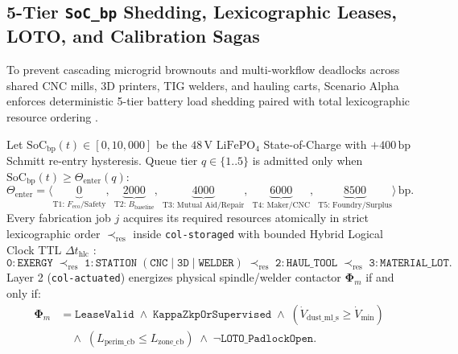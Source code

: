 \subsection{5-Tier \texttt{SoC\_bp} Shedding, Lexicographic Leases, LOTO, and Calibration Sagas}

To prevent cascading microgrid brownouts and multi-workflow deadlocks across shared CNC
mills, 3D printers, TIG welders, and hauling carts, Scenario Alpha enforces deterministic
5-tier battery load shedding paired with total lexicographic resource ordering \parencite{coffman1971deadlocks,liu1973scheduling}.

\begin{invariant}
\label{inv:alpha-fab}
Let $\mathrm{SoC}_{\mathrm{bp}}(t) \in [0, 10{,}000]$ be the $48\,\mathrm{V}$ $\mathrm{LiFePO_4}$
State-of-Charge with $+400\,\mathrm{bp}$ Schmitt re-entry hysteresis. Queue tier $q \in \{1..5\}$
is admitted only when $\mathrm{SoC}_{\mathrm{bp}}(t) \ge \Theta_{\mathrm{enter}}(q)$:
\begin{equation}
    \Theta_{\mathrm{enter}} = \big\langle \underbrace{0}_{\text{T1: } F_{\mathrm{eco}}/\text{Safety}},\;
    \underbrace{2000}_{\text{T2: } B_{\mathrm{baseline}}},\;
    \underbrace{4000}_{\text{T3: Mutual Aid/Repair}},\;
    \underbrace{6000}_{\text{T4: Maker/CNC}},\;
    \underbrace{8500}_{\text{T5: Foundry/Surplus}} \big\rangle\,\mathrm{bp}.
    \label{eq:alpha-soc-tiers}
\end{equation}
Every fabrication job $j$ acquires its required resources atomically in strict lexicographic
order $\prec_{\mathrm{res}}$ inside \texttt{col-storaged} with bounded Hybrid Logical Clock
TTL $\Delta t_{\mathrm{hlc}}$ \parencite{kulkarni2014logical}:
{\small
\begin{equation}
    \mathtt{0:EXERGY} \;\prec_{\mathrm{res}}\; \mathtt{1:STATION\;(CNC \mid 3D \mid WELDER)} \;\prec_{\mathrm{res}}\; \mathtt{2:HAUL\_TOOL} \;\prec_{\mathrm{res}}\; \mathtt{3:MATERIAL\_LOT}.
    \label{eq:alpha-lex}
\end{equation}
}
Layer 2 (\texttt{col-actuated}) energizes physical spindle/welder contactor $\mathbf{\Phi}_m$
if and only if:
{\small
\begin{equation}
\begin{aligned}
    \mathbf{\Phi}_m &= \mathtt{LeaseValid} \;\land\; \mathtt{KappaZkpOrSupervised} \;\land\; (\dot{V}_{\mathrm{dust\_ml\_s}} \ge \dot{V}_{\min}) \\
    &\quad \land\; (L_{\mathrm{perim\_cb}} \le L_{\mathrm{zone\_cb}}) \;\land\; \neg\mathtt{LOTO\_PadlockOpen}.
\end{aligned}
    \label{eq:alpha-loto}
\end{equation}
}
\end{invariant}

